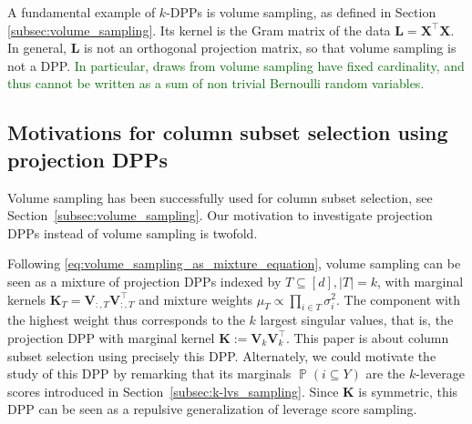 \documentclass[twoside,11pt]{book}
\newcommand{\rev}[1]{\textcolor{darkgreen}{#1}}
\numberwithin{theorem}{chapter}
\numberwithin{definition}{chapter}
\numberwithin{proposition}{chapter}
\numberwithin{corollary}{chapter}
\numberwithin{example}{chapter}
\numberwithin{lemma}{chapter}
\numberwithin{assumption}{chapter}
\DeclareMathOperator{\Det}{Det}
\DeclareMathOperator{\Tran}{\intercal}
\DeclareMathOperator{\Prb}{\mathbb{P}}
\begin{document}

A fundamental example of $k$-DPPs is volume sampling, as defined in Section \ref{subsec:volume_sampling}. Its kernel is the Gram matrix of the data $\bm{L} = \bm{X}^{\Tran}\bm{X}$. In general, $\bm{L}$ is not an orthogonal projection matrix, so that volume sampling is not a DPP. \rev{In particular, draws from volume sampling have fixed cardinality, and thus cannot be written as a sum of non trivial Bernoulli random variables.}

\subsection{Motivations for column subset selection using projection DPPs}
Volume sampling has been successfully used for column subset selection, see Section~\ref{subsec:volume_sampling}. Our motivation to investigate projection DPPs instead of volume sampling is twofold.

Following \eqref{eq:volume_sampling_as_mixture_equation}, volume sampling can be seen as a mixture of projection DPPs indexed by $T\subseteq [d], \vert T\vert=k$, with marginal kernels $\bm{K}_{T} = \bm{V}^{}_{:,T}\bm{V}^{\Tran}_{:,T}$ and mixture weights $\mu_{T} \propto \prod_{i \in T} \sigma_{i}^{2}$. The component with the highest weight thus corresponds to the $k$ largest singular values, that is, the projection DPP with marginal kernel
$\bm K:=\bm{V}^{}_{k}\bm{V}_{k}^{\Tran}$. This paper is about column subset selection using precisely this DPP. Alternately, we could motivate the study of this DPP by remarking that its marginals $\Prb({i}\subseteq Y)$ are the $k$-leverage scores introduced in Section~\ref{subsec:k-lvs_sampling}. Since $\bm K$ is symmetric, this DPP can be seen as a repulsive generalization of leverage score sampling.
\end{document}
